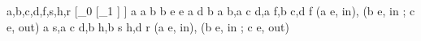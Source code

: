 a,b,c,d,f,s,h,r
[_{0} [_{1} ] ]
a a b b e e
a d b
a \rightarrow b,a \rightarrow c d,a \rightarrow f,b \rightarrow c,d \rightarrow f
(a e, in), (b e, in ; c e, out)
a \rightarrow s,a \rightarrow c d,b \rightarrow h,b \rightarrow s h,d \rightarrow r
(a e, in), (b e, in ; c e, out)